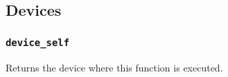 \documentclass{note}\usepackage{mathptm,mydef}
\begin{document}



\subsection{Devices}
\subsubsection{\small\textcolor{red2}{\texttt{device\_self}}}
Returns the device where this function is executed.
\end{document}
